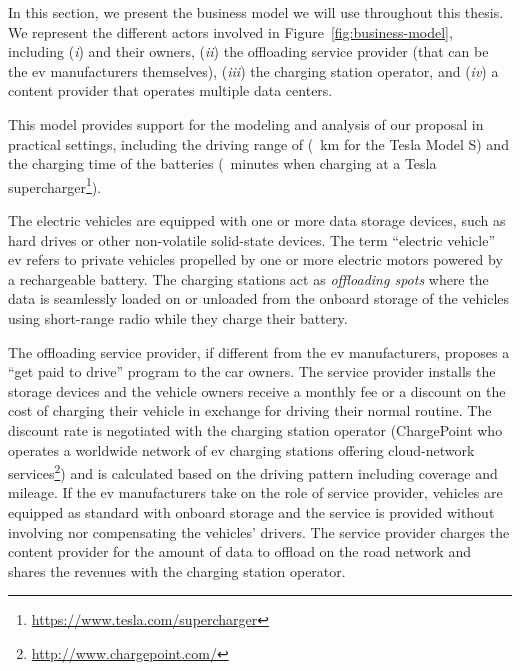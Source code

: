 In this section, we present the business model we will use throughout this thesis. We represent the different actors involved in Figure~\ref{fig:business-model}, including (\textit{i})  and their owners, (\textit{ii}) the offloading service provider (that can be the \acrshort{ev} manufacturers themselves), (\textit{iii}) the charging station operator, and (\textit{iv}) a content provider that operates multiple data centers. 

This model provides support for the modeling and analysis of our proposal in practical settings, including the driving range of  (~km for the Tesla Model S) and the charging time of the batteries (~minutes when charging at a Tesla supercharger\footnote{\url{https://www.tesla.com/supercharger}}). 

The electric vehicles are equipped with one or more data storage devices, such as hard drives or other non-volatile solid-state devices. 
The term ``electric vehicle'' \acrshort{ev} refers to private vehicles propelled by one or more electric motors powered by a rechargeable battery. %
The charging stations act as \textit{offloading spots} where the data is seamlessly loaded on or unloaded from the onboard storage of the vehicles using short-range radio while they charge their battery. 

The offloading service provider, if different from the \acrshort{ev} manufacturers, proposes a ``get paid to drive'' program to the car owners. The service provider installs the storage devices and the vehicle owners receive a monthly fee or a discount on the cost of charging their vehicle in exchange for driving their normal routine. The discount rate is negotiated with the charging station operator (\eg ChargePoint who operates a worldwide network of \acrshort{ev} charging stations offering cloud-network services\footnote{\url{http://www.chargepoint.com/}}) and is calculated based on the driving pattern including coverage and mileage. If the \acrshort{ev} manufacturers take on the role of service provider, vehicles are equipped as standard with onboard storage and the service is provided without involving nor compensating the vehicles' drivers. The service provider charges the content provider for the amount of data to offload on the road network and shares the revenues with the charging station operator. 

